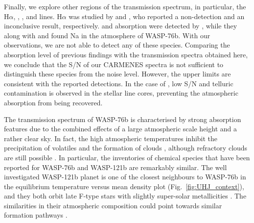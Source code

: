\documentclass{aa}
\begin{document}
Finally, we explore other regions of the transmission spectrum, in particular, the H$\alpha$, , , and  lines. H$\alpha$ was studied by \citet{Zak2019} and \citet{Tabernero2020}, who reported a non-detection and an inconclusive result, respectively.  and  absorption were detected by \citet{Tabernero2020}, while %
they along with \citet{Zak2019} and \citet{Seidel2019} found Na in the atmosphere of WASP-76b. With our observations, we are not able to detect any of these species. Comparing the absorption level of previous findings with the transmission spectra obtained here, we conclude that the S/N of our CARMENES spectra is not sufficient to distinguish these species from the noise level. However, the upper limits are consistent with the reported detections. In the case of , low S/N and telluric contamination is observed in the stellar line cores, preventing the atmospheric absorption from being recovered. 

The transmission spectrum of WASP-76b is characterised by strong absorption features due to the combined effects of a large atmospheric scale height and a rather clear sky. In fact, the high atmospheric temperatures inhibit the precipitation of volatiles and the formation of clouds \citep{Wakeford2017}, although refractory clouds are still possible \citep{Sing2013}. In particular, the inventories of chemical species that have been reported for WASP-76b and WASP-121b are remarkably similar. 
The well investigated WASP-121b planet is one of the closest neighbours to WASP-76b in the equilibrium temperature versus mean density plot (Fig.~\ref{fig:UHJ_context}), and they both orbit late F-type stars with slightly super-solar metallicities \citep{Tabernero2020}. The similarities in their atmospheric composition could point towards similar formation pathways \citep{Turrini2015}.
\end{document}

